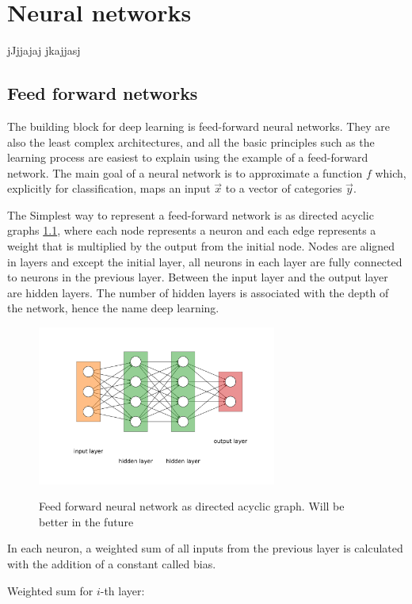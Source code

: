 \chapter{Neural networks}

jJjjajaj \cite{Goodfellow-conv} jkajjasj






\section{Feed forward networks}
The building block for deep learning is feed-forward neural networks. They are also the least complex architectures, and all the basic principles such as the learning process are easiest to explain using the example of a feed-forward network. The main goal of a neural network is to approximate a function $f$ which, explicitly for classification, maps an input $\Vec{x}$ to a vector of categories $\Vec{y}$.
\par The Simplest way to represent a feed-forward network is as directed acyclic graphs 
\ref{FF_graph}, where each node represents a neuron and each edge represents a weight that is multiplied by the output from the initial node. Nodes are aligned in layers and except the initial layer, all neurons in each layer are fully connected to neurons in the previous layer. Between the input layer and the output layer are hidden layers. The number of hidden layers is associated with the depth of the network, hence the name deep learning.

\begin{figure}[h]
\includegraphics[width=0.7\textwidth]{Images/ff_graph.pdf}
\label{FF_graph}
\centering
\caption{Feed forward neural network as directed acyclic graph. Will be better in the future}
\end{figure}

In each neuron, a weighted sum of all inputs from the previous layer is calculated with the addition of a constant called bias.
\par Weighted sum for $i$-th layer: 

